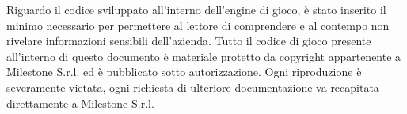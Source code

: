 Riguardo il codice sviluppato all'interno dell'engine di gioco, è stato inserito il minimo necessario per permettere al lettore di comprendere e al contempo non rivelare informazioni sensibili dell'azienda. Tutto il codice di gioco presente all'interno di questo documento è materiale protetto da copyright appartenente a Milestone S.r.l. ed è pubblicato sotto autorizzazione. Ogni riproduzione è severamente vietata, ogni richiesta di ulteriore documentazione va recapitata direttamente a Milestone S.r.l.